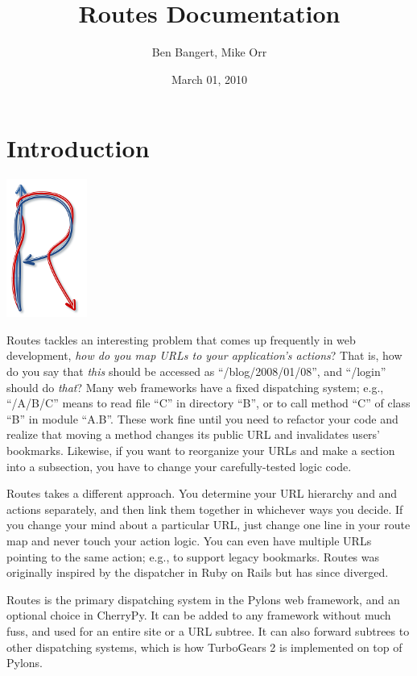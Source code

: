 \documentclass[letterpaper,10pt,english]{manual}
\title{Routes Documentation}
\date{March 01, 2010}
\author{Ben Bangert, Mike Orr}
\begin{document}
\maketitle
\tableofcontents
\hypertarget{--doc-contents}{}


\resetcurrentobjects
\hypertarget{--doc-introduction}{}

\chapter{Introduction}

{\includegraphics{routes-logo.png}\hfill}

Routes tackles an interesting problem that comes up frequently in web
development, \emph{how do you map URLs to your application's actions}? That is, how
do you say that \emph{this} should be accessed as ``/blog/2008/01/08'', and ``/login''
should do \emph{that}? Many web frameworks have a fixed dispatching system; e.g.,
``/A/B/C'' means to read file ``C'' in directory ``B'', or to call method ``C'' of
class ``B'' in module ``A.B''. These work fine until you need to refactor your code
and realize that moving a method changes its public URL and invalidates users'
bookmarks.  Likewise, if you want to reorganize your URLs and make a section
into a subsection, you have to change your carefully-tested logic code.

Routes takes a different approach. You determine your URL hierarchy and and
actions separately, and then link them together in whichever ways you decide.
If you change your mind about a particular URL, just change one line in your
route map and never touch your action logic. You can even have multiple URLs
pointing to the same action; e.g., to support legacy bookmarks.  Routes was
originally inspired by the dispatcher in Ruby on Rails but has since diverged.

Routes is the primary dispatching system in the Pylons web framework, and an
optional choice in CherryPy. It can be added to any
framework without much fuss, and used for an entire site or a URL subtree.
It can also forward subtrees to other dispatching systems, which is how
TurboGears 2 is implemented on top of Pylons.
\end{document}

